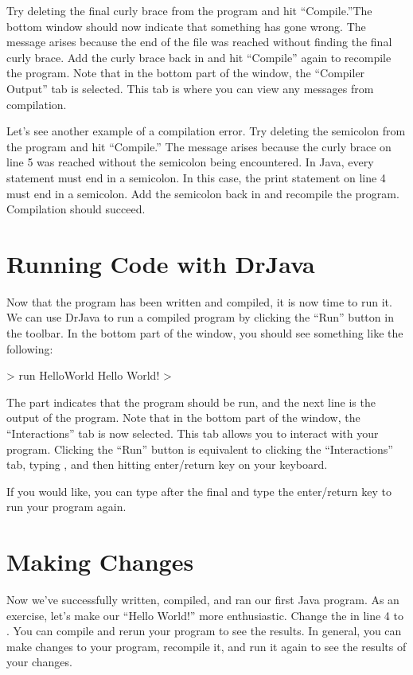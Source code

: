 Try deleting the final curly brace \ic{\}} from the program and hit ``Compile.''The bottom window should now indicate that something has gone wrong.
The message  arises because
the end of the file was reached without finding the final curly brace.
Add the curly brace back in and hit ``Compile'' again to recompile the program.
Note that in the bottom part of the window, the ``Compiler Output'' tab is selected. This tab is where you can view any messages from compilation.

Let's see another example of a compilation error. Try deleting the semicolon \ic{;} from the program and hit ``Compile.''
The message  arises because the curly brace on line 5 was reached without the semicolon being
encountered. In Java, every statement must end in a semicolon. In this case, the print statement on line 4 must
end in a semicolon. Add the semicolon back in and recompile the program. Compilation should succeed.

\section{Running Code with DrJava}
Now that the program has been written and compiled, it is now time to run it.
We can use DrJava to run a compiled program by clicking the ``Run'' button in the toolbar. In the bottom part of the window, you should see something like the following:
\begin{code}
> run HelloWorld
Hello World!
>
\end{code}
The  part indicates that the program  should be run, and the next line is the output of the program.
Note that in the bottom part of the window, the ``Interactions'' tab is now
selected. This tab allows you to interact with your program. Clicking
the ``Run'' button is equivalent to clicking the ``Interactions'' tab, typing
, and then hitting enter/return key on your keyboard.

If you would like, you can type  after the final \ic{>} and
type the enter/return key to run your program again.

\section{Making Changes}
Now we've successfully written, compiled, and ran our first Java program.
As an exercise, let's make our ``Hello World!'' more enthusiastic.
Change the  in line 4 to .
You can compile and rerun your program to see the results. In general,
you can make changes to your program, recompile it, and run it again
to see the results of your changes.

